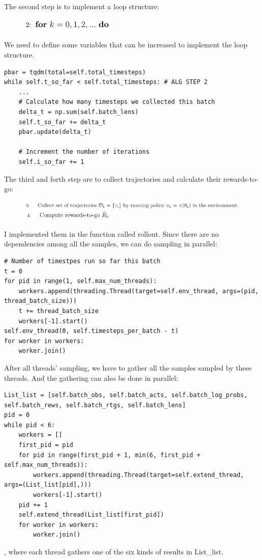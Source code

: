 \documentclass[UTF8, a4paper, 11pt]{article}
\begin{document}
The second step is to implement a loop structure:
\begin{figure}[H]
    \centering
    \includegraphics[width = 0.4\textwidth]{step2.png}
\end{figure}
We need to define some variables that can be increased to implement the loop structure.
\begin{lstlisting}
pbar = tqdm(total=self.total_timesteps)
while self.t_so_far < self.total_timesteps: # ALG STEP 2
    ...
    # Calculate how many timesteps we collected this batch
    delta_t = np.sum(self.batch_lens)
    self.t_so_far += delta_t
    pbar.update(delta_t)

    # Increment the number of iterations
    self.i_so_far += 1
\end{lstlisting}
The third and forth step are to collect trajectories and calculate their rewards-to-go:
\begin{figure}[H]
    \centering
    \includegraphics[width = \textwidth]{step3.png}
    \includegraphics[width = 0.4\textwidth]{step4.png}
\end{figure}
I implemented them in the function called rollout. Since there are no dependencies among all the samples, we can do sampling in parallel:
\begin{lstlisting}
# Number of timestpes run so far this batch
t = 0
for pid in range(1, self.max_num_threads):
    workers.append(threading.Thread(target=self.env_thread, args=(pid, thread_batch_size)))
    t += thread_batch_size
    workers[-1].start()
self.env_thread(0, self.timesteps_per_batch - t)
for worker in workers:
    worker.join()
\end{lstlisting}
After all threads' sampling, we have to gather all the samples sampled by these threads. And the gathering can also be done in parallel:
\begin{lstlisting}
List_list = [self.batch_obs, self.batch_acts, self.batch_log_probs, self.batch_rews, self.batch_rtgs, self.batch_lens]
pid = 0
while pid < 6:
    workers = []
    first_pid = pid
    for pid in range(first_pid + 1, min(6, first_pid + self.max_num_threads)):
        workers.append(threading.Thread(target=self.extend_thread, args=(List_list[pid],)))
        workers[-1].start()
    pid += 1
    self.extend_thread(List_list[first_pid])
    for worker in workers:
        worker.join()
\end{lstlisting}
, where each thread gathers one of the six kinds of results in List\_list.
\end{document}

